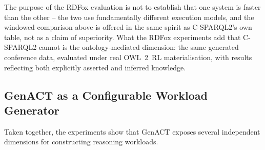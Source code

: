 The purpose of the RDFox evaluation is not to establish that one system is
faster than the other -- the two use fundamentally different execution models,
and the windowed comparison above is offered in the same spirit as
C-SPARQL2's own table, not as a claim of superiority. What the RDFox
experiments add that C-SPARQL2 cannot is the ontology-mediated dimension: the
same generated conference data, evaluated under real OWL~2~RL materialisation,
with results reflecting both explicitly asserted and inferred knowledge.

\subsection{GenACT as a Configurable Workload Generator}
\label{subsec:genact-workload-generator}

Taken together, the experiments show that GenACT exposes several independent
dimensions for constructing reasoning workloads.

